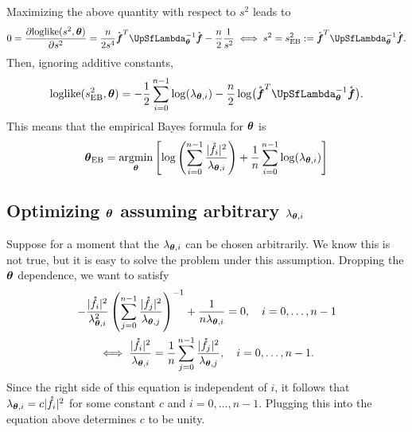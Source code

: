 \documentclass{amsart}
\newcommand{\rvf}{\mathring{\vf}}
\begin{document}
Maximizing the above quantity with respect to $s^2$ leads to 
\begin{equation*}
    0  =\frac{\partial \text{loglike}(s^2,\vtheta)}{\partial s^2}
    = \frac n{2 s^4} \rvf^T\mLambda_{\vtheta}^{-1} \rvf 
 - \frac{n}2 \frac {1}{s^2}
 \iff s^2 = s_{\text{EB}}^2 := \rvf^T\mLambda_{\vtheta}^{-1} \rvf .
\end{equation*}
Then, ignoring additive constants,
\begin{equation*}
    \text{loglike}(s_{\text{EB}}^2,\vtheta) 
	= 
- \frac 12 \sum_{i=0}^{n-1} \log(\lambda_{\vtheta,i}) - \frac n2 \log\bigl(\rvf^T\mLambda_{\vtheta}^{-1} \rvf \bigr).
\end{equation*}
This means that the empirical Bayes formula for $\boldsymbol{\theta}$ is
\begin{equation} \label{eq:EBOpt}
    \boldsymbol{\theta}_{\text{EB}} 
    = \operatorname*{argmin}_{\boldsymbol{\theta}} \left [\log\left( \sum_{i=0}^{n-1} \frac{\lvert\mathring{f}_i\rvert^2}{\lambda_{\boldsymbol{\theta},i}} \right)
    + \frac 1n \sum_{i=0}^{n-1} \log(\lambda_{\boldsymbol{\theta},i} ) \right ]
\end{equation}


\subsection{Optimizing  $\boldsymbol{\theta}$ assuming arbitrary $\lambda_{\boldsymbol{\theta},i}$}
Suppose for a moment that the $\lambda_{\boldsymbol{\theta},i}$ can be chosen arbitrarily.   We know this is not true, but it is easy to solve the problem under this assumption.  Dropping the $\boldsymbol{\theta}$ dependence, we want to satisfy
\begin{multline*} 
    - \frac{\lvert\mathring{f}_i\rvert^2}{\lambda_{\boldsymbol{\theta},i}^2} \left( \sum_{j=0}^{n-1} \frac{\lvert\mathring{f}_j\rvert^2}{\lambda_{\boldsymbol{\theta}, j}} \right)^{-1} + \frac 1{n\lambda_{\boldsymbol{\theta},i}} = 0, \quad i = 0, \ldots, n-1
    \\
    \iff
    \frac{\lvert\mathring{f}_i\rvert^2}{\lambda_{\boldsymbol{\theta},i}} = \frac 1n \sum_{j=0}^{n-1} \frac{\lvert\mathring{f}_j\rvert^2}{\lambda_{\boldsymbol{\theta},j}}, \quad i = 0, \ldots, n-1.
\end{multline*}
Since the right side of this equation is independent of $i$, it follows that $\lambda_{\boldsymbol{\theta},i} = c \lvert\mathring{f}_i\rvert^2$ for some constant $c$ and $i = 0, \ldots, n-1$.  Plugging this into the equation above determines $c$ to be unity.
\end{document}

